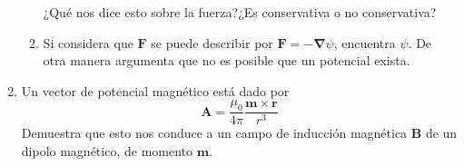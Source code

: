 \documentclass[12pt]{article}
\begin{document}
\begin{enumerate}
\begin{enumerate}
¿Qué nos dice esto sobre la fuerza?¿Es conservativa o no conservativa?
\item Si considera que $\mathbf{F}$ se puede describir por $\mathbf{F} = - \bm{\nabla}\psi$, encuentra $\psi$. De otra manera argumenta que no es posible que un potencial exista.
\end{enumerate}
\item Un vector de potencial magnético está dado por
\[ \mathbf{A} = \dfrac{\mu_{0}}{4 \pi} \dfrac{\mathbf{m} \times \mathbf{r}}{r^{3}} \]
Demuestra que esto nos conduce a un campo de inducción magnética $\mathbf{B}$ de un dipolo magnético, de momento $\mathbf{m}$.
\end{enumerate}
\end{document}
